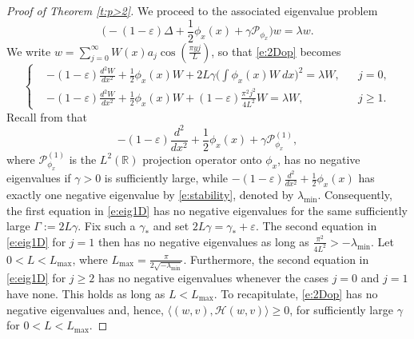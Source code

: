 \documentclass[final,11pt]{article}
\renewcommand{\geq}{\geqslant}
\theoremstyle{definition} %
\newcommand{\R}{\mathbb{R}}
\newcommand{\eps}{\varepsilon}
\theoremstyle{plain}
\theoremstyle{definition} %
\theoremstyle{remark}
\begin{document}
\begin{proof}[Proof of Theorem \ref{t:p>2}]
We proceed to the associated eigenvalue problem
\begin{equation}\label{e:2Dop} 
\Big(- ( 1 - \varepsilon) \Delta + \frac { 1 } { 2 } \phi _ { x }(x) + \gamma \mathcal{P}_{\phi_x}\Big)w=\lambda w. 
\end{equation}
We write $w = \sum_{j = 0}^\infty W(x)a_j\cos(\frac{\pi y j}{L})$, so that \eqref{e:2Dop} becomes
\begin{equation}\label{e:eig1D}
\left\{\begin{aligned}
&- ( 1 - \varepsilon) \frac{d^2W}{dx^2} + \frac { 1 } { 2 } \phi _ { x }(x)W +2L\gamma \Big(\int\phi_{x}(x)W~dx\Big)^{2} = \lambda W, && j=0,\\
&- ( 1 - \varepsilon)\frac{d^2W}{dx^2} + \frac { 1 } { 2 } \phi _ { x }(x)W + (1-\varepsilon)\frac{\pi^2j^2}{4L^2}W = \lambda W, && j \geq 1.
\end{aligned}\right.
\end{equation}
Recall from \cite{BARKER2025} that 
\[-(1-\varepsilon)\frac{d^2}{dx^2}+ \frac { 1 } { 2 } \phi _ { x } (x)+ \gamma \mathcal{P}^{(1)}_{\phi_x},
\]
where $\mathcal{P}^{(1)}_{\phi_x}$ is the $L^2(\R)$ projection operator onto $\phi_x$, has no negative eigenvalues if $\gamma>0$ is sufficiently large, while $-(1-\varepsilon)\frac{d^2}{dx^2}+\frac12\phi_x(x)$ has exactly one negative eigenvalue by \eqref{e:stability}, denoted by $\lambda_{\min}$. 
Consequently, the first equation in \eqref{e:eig1D} has no negative eigenvalues for the same sufficiently large $\Gamma := 2L\gamma$. Fix such a $\gamma_*$ and set $2L\gamma=\gamma_*+\eps$.
The second equation in \eqref{e:eig1D} for $j=1$ then has no negative eigenvalues as long as $\frac{\pi^2}{4L^2}>-\lambda_{\min}$. Let $0 < L < L_{\max}$, where $L_{\max} = \frac{\pi}{2\sqrt{-\lambda_\textrm{min}}}$.
Furthermore, the second equation in \eqref{e:eig1D} for $j\geq2$ has no negative eigenvalues whenever the cases $j=0$ and $j=1$ have none. This holds as long as $L<L_{\max}$. To recapitulate, \eqref{e:2Dop} has no negative eigenvalues and, hence, $\langle (w,v) , \mathcal{H}(w,v)\rangle\geq0$, for sufficiently large $\gamma$ for $0<L<L_{\max}$.


\end{proof}
\end{document}
